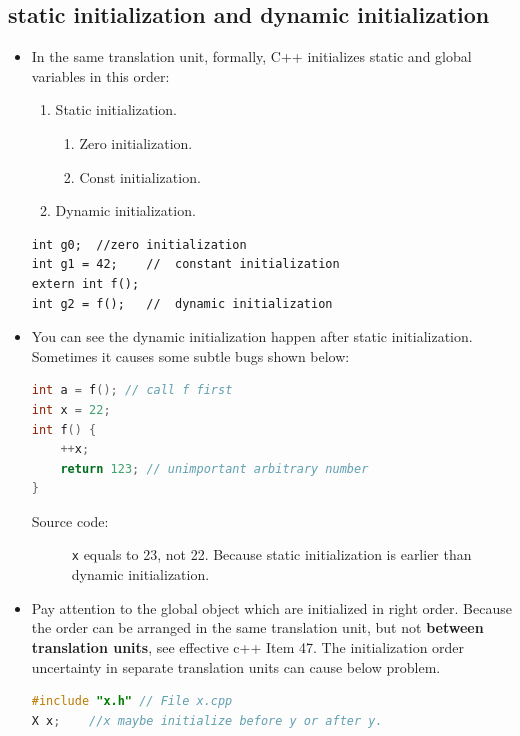 \documentclass[a4paper,11pt,twoside]{book}
\begin{document}
\subsection{static initialization and dynamic initialization}
\begin{itemize}
	\item In the same translation unit, formally, C++ initializes static and global variables in this order:
	\begin{enumerate}
		\item Static initialization.
			\begin{enumerate}
			\item Zero initialization.
			\item Const initialization.
			\end{enumerate}
		\item Dynamic initialization.
	\end{enumerate}
		
\begin{lstlisting}[numbers=none]
int g0;  //zero initialization
int g1 = 42;    //  constant initialization
extern int f();
int g2 = f();   //  dynamic initialization
\end{lstlisting}

	\item You can see the dynamic initialization happen after static initialization. Sometimes it causes some subtle bugs shown below:
\begin{lstlisting}[frame=single, language=c++, mathescape=true]
int a = f(); // call f first
int x = 22;
int f() {
	++x;
	return 123; // unimportant arbitrary number
}
\end{lstlisting}
\begin{description}
	\item[Source code:] \texttt{x} equals to 23, not 22. Because static initialization is earlier than dynamic initialization.
\end{description}
	
	\item Pay attention to the global object which are initialized in right order. Because the order can be arranged in the same translation unit, but not \textbf{between translation units}, see effective c++ Item 47. The initialization order uncertainty in separate translation units can cause below problem.
	
\begin{lstlisting}[frame=single, language=c++]
#include "x.h" // File x.cpp
X x;    //x maybe initialize before y or after y.
	

\end{lstlisting}
\end{itemize}
\end{document}
